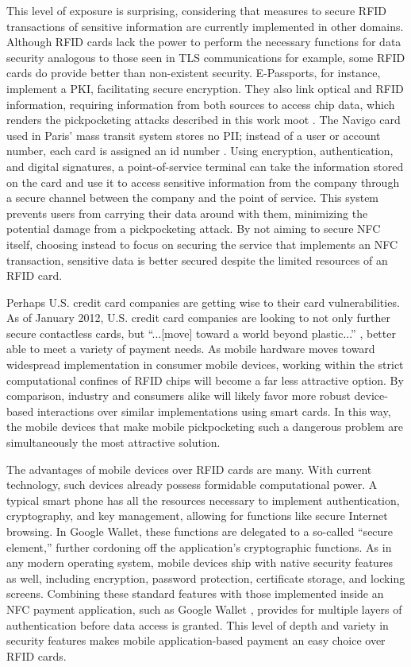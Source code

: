 \documentclass{sig-alternate}
\begin{document}
This level of exposure is surprising, considering that measures to secure RFID transactions of sensitive information are currently implemented in other domains.  Although RFID cards lack the power to perform the necessary functions for data security analogous to those seen in TLS communications for example, some RFID cards do provide better than non-existent security.  E-Passports, for instance, implement a PKI, facilitating secure encryption. They also link optical and RFID information, requiring information from both sources to access chip data, which renders the pickpocketing attacks described in this work moot \cite{security-privacy-epassports}.  The Navigo card used in Paris' mass transit system stores no PII; instead of a user or account number, each card is assigned an id number \cite{bt-hacking-nfc-ccs}.  Using encryption, authentication, and digital signatures, a point-of-service terminal can take the information stored on the card and use it to access sensitive information from the company through a secure channel between the company and the point of service.  This system prevents users from carrying their data around with them, minimizing the potential damage from a pickpocketing attack.  By not aiming to secure NFC itself, choosing instead to focus on securing the service that implements an NFC transaction, sensitive data is better secured despite the limited resources of an RFID card.  

Perhaps U.S. credit card companies are getting wise to their card vulnerabilities.  As of January 2012, U.S. credit card companies are looking to not only further secure contactless cards, but ``...[move] toward a world beyond plastic...'' \cite{emv-upgrade}, better able to meet a variety of payment needs.  As mobile hardware moves toward widespread implementation in consumer mobile devices, working within the strict computational confines of RFID chips will become a far less attractive option. By comparison, industry and consumers alike will likely favor more robust device-based interactions over similar implementations using smart cards.  In this way, the mobile devices that make mobile pickpocketing such a dangerous problem are simultaneously the most attractive solution.     

The advantages of mobile devices over RFID cards are many.  With current technology, such devices already possess formidable computational power.  A typical smart phone has all the resources necessary to implement authentication, cryptography, and key management, allowing for functions like secure Internet browsing.  In Google Wallet, these functions are delegated to a so-called ``secure element,'' further cordoning off the application's cryptographic functions.  As in any modern operating system, mobile devices ship with native security features as well, including encryption, password protection, certificate storage, and locking screens.  Combining these standard features with those implemented inside an NFC payment application, such as Google Wallet \cite{google-wallet-security-1}, provides for multiple layers of authentication before data access is granted.  This level of depth and variety in security features makes mobile application-based payment an easy choice over RFID cards.  
\end{document}
